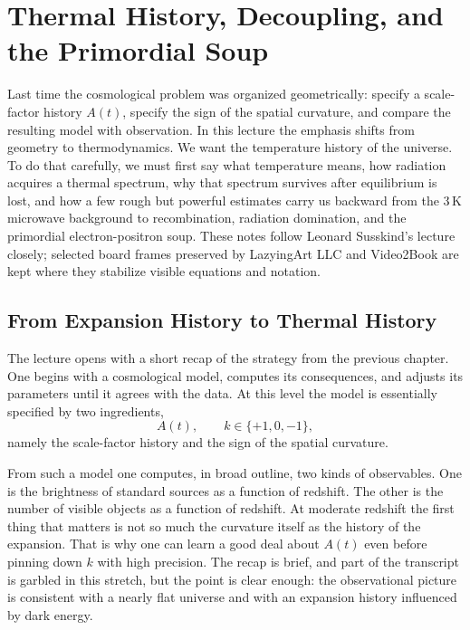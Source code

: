 \chapter{Thermal History, Decoupling, and the Primordial Soup}

Last time the cosmological problem was organized geometrically: specify a scale-factor history \(A(t)\), specify the sign of the spatial curvature, and compare the resulting model with observation. In this lecture the emphasis shifts from geometry to thermodynamics. We want the temperature history of the universe. To do that carefully, we must first say what temperature means, how radiation acquires a thermal spectrum, why that spectrum survives after equilibrium is lost, and how a few rough but powerful estimates carry us backward from the \(3\,\mathrm{K}\) microwave background to recombination, radiation domination, and the primordial electron-positron soup. These notes follow Leonard Susskind's lecture closely; selected board frames preserved by LazyingArt LLC and Video2Book are kept where they stabilize visible equations and notation.

\section{From Expansion History to Thermal History}

The lecture opens with a short recap of the strategy from the previous chapter. One begins with a cosmological model, computes its consequences, and adjusts its parameters until it agrees with the data. At this level the model is essentially specified by two ingredients,
\begin{equation}
A(t),
\qquad
k \in \{+1,0,-1\},
\end{equation}
namely the scale-factor history and the sign of the spatial curvature.

From such a model one computes, in broad outline, two kinds of observables. One is the brightness of standard sources as a function of redshift. The other is the number of visible objects as a function of redshift. At moderate redshift the first thing that matters is not so much the curvature itself as the history of the expansion. That is why one can learn a good deal about \(A(t)\) even before pinning down \(k\) with high precision. The recap is brief, and part of the transcript is garbled in this stretch, but the point is clear enough: the observational picture is consistent with a nearly flat universe and with an expansion history influenced by dark energy.

